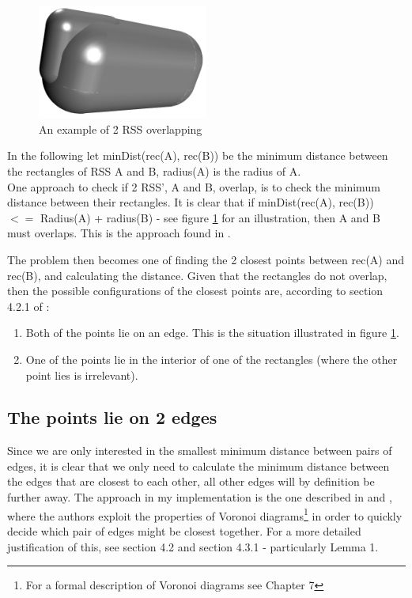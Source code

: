 \begin{figure}
\centering
\includegraphics[width=0.5\textwidth]{figures/normalInter}
\caption{\label{normal-inter}An example of 2 RSS overlapping}
\end{figure}

In the following let minDist(rec(A), rec(B)) be the minimum distance between the rectangles of RSS A and B, radius(A) is the radius of A.\\

One approach to check if 2 RSS', A and B, overlap, is to check the minimum distance between their rectangles. It is clear that if minDist(rec(A), rec(B)) $<=$ Radius(A) + radius(B) - see figure \ref{normal-inter} for an illustration, then A and B must overlaps. This is the approach found in \cite{Larsen99fastproximity}.

The problem then becomes one of finding the 2 closest points between rec(A) and rec(B), and calculating the distance.
Given that the rectangles do not overlap, then the possible configurations of the closest points are, according to section 4.2.1 of \cite{Larsen99fastproximity}:
\begin{enumerate}
\item Both of the points lie on an edge. This is the situation illustrated in figure \ref{normal-inter}.
\item One of the points lie in the interior of one of the rectangles (where the other point lies is irrelevant). 
\end{enumerate}

\subsection{The points lie on 2 edges}
\label{minimumDistance}
Since we are only interested in the smallest minimum distance between pairs of edges, it is clear that we only need to calculate the minimum distance between the edges that are closest to each other, all other edges will by definition be further away. The approach in my implementation is the one described in \cite{larsen00fast} and \cite{Larsen99fastproximity}, where the authors exploit the properties of Voronoi diagrams\footnote{For a formal description of Voronoi diagrams see \cite{compgeom:2008} Chapter 7} in order to quickly decide which pair of edges might be closest together. For a more detailed justification of this, see \cite{larsen00fast} section 4.2 and \cite{Larsen99fastproximity} section 4.3.1 - particularly Lemma 1. 

